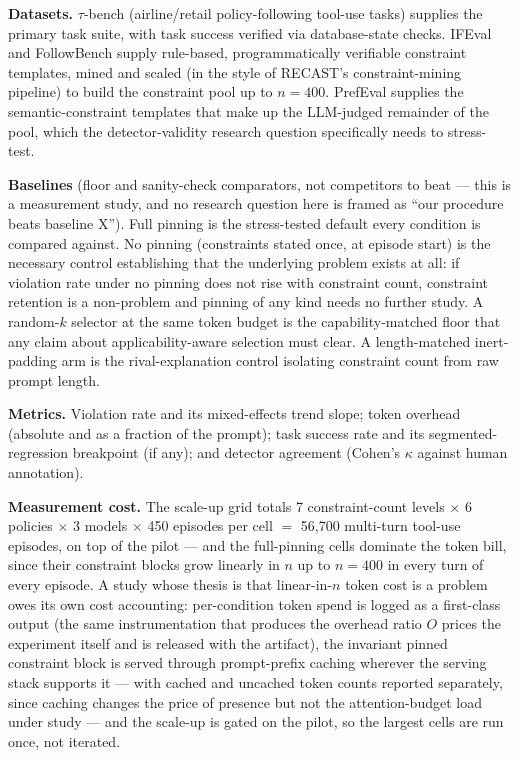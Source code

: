 \documentclass[11pt]{article}
\begin{document}
\textbf{Datasets.} $\tau$-bench (airline/retail policy-following tool-use tasks) supplies the primary task suite, with task success verified via database-state checks. IFEval and FollowBench supply rule-based, programmatically verifiable constraint templates, mined and scaled (in the style of RECAST's constraint-mining pipeline) to build the constraint pool up to $n=400$. PrefEval supplies the semantic-constraint templates that make up the LLM-judged remainder of the pool, which the detector-validity research question specifically needs to stress-test.

\textbf{Baselines} (floor and sanity-check comparators, not competitors to beat --- this is a measurement study, and no research question here is framed as ``our procedure beats baseline X''). Full pinning is the stress-tested default every condition is compared against. No pinning (constraints stated once, at episode start) is the necessary control establishing that the underlying problem exists at all: if violation rate under no pinning does not rise with constraint count, constraint retention is a non-problem and pinning of any kind needs no further study. A random-$k$ selector at the same token budget is the capability-matched floor that any claim about applicability-aware selection must clear. A length-matched inert-padding arm is the rival-explanation control isolating constraint count from raw prompt length.

\textbf{Metrics.} Violation rate and its mixed-effects trend slope; token overhead (absolute and as a fraction of the prompt); task success rate and its segmented-regression breakpoint (if any); and detector agreement (Cohen's $\kappa$ against human annotation).

\textbf{Measurement cost.} The scale-up grid totals 7 constraint-count levels $\times$ 6 policies $\times$ 3 models $\times$ 450 episodes per cell $=$ 56{,}700 multi-turn tool-use episodes, on top of the pilot --- and the full-pinning cells dominate the token bill, since their constraint blocks grow linearly in $n$ up to $n=400$ in every turn of every episode. A study whose thesis is that linear-in-$n$ token cost is a problem owes its own cost accounting: per-condition token spend is logged as a first-class output (the same instrumentation that produces the overhead ratio $O$ prices the experiment itself and is released with the artifact), the invariant pinned constraint block is served through prompt-prefix caching wherever the serving stack supports it --- with cached and uncached token counts reported separately, since caching changes the price of presence but not the attention-budget load under study --- and the scale-up is gated on the pilot, so the largest cells are run once, not iterated.
\end{document}
